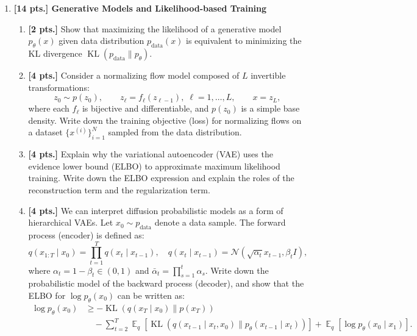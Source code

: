 \documentclass[11pt,a4paper]{article}
\DeclareMathOperator{\E}{\mathbb{E}}
\DeclareMathOperator{\KL}{KL}
\begin{document}
\begin{enumerate}[label=\textbf{\arabic*.}]
    \item \textbf{[14 pts.] Generative Models and Likelihood-based Training}
    \begin{enumerate}[label=(\a*)]
        \item \textbf{[2 pts.]} Show that maximizing the likelihood of a generative model $p_\theta(x)$ given data distribution $p_{\text{data}}(x)$ is equivalent to minimizing the KL divergence $\KL(p_{\text{data}} \parallel p_\theta)$.
        \item \textbf{[4 pts.]} Consider a normalizing flow model composed of $L$ invertible transformations:
        \[
        z_0 \sim p(z_0), \qquad z_\ell = f_\ell(z_{\ell-1}), \; \ell = 1, \dots, L, \qquad x = z_L,
        \]
        where each $f_\ell$ is bijective and differentiable, and $p(z_0)$ is a simple base density. Write down the training objective (loss) for normalizing flows on a dataset $\{x^{(i)}\}_{i=1}^N$ sampled from the data distribution.
        \item \textbf{[4 pts.]} Explain why the variational autoencoder (VAE) uses the evidence lower bound (ELBO) to approximate maximum likelihood training. Write down the ELBO expression and explain the roles of the reconstruction term and the regularization term.
        \item \textbf{[4 pts.]} We can interpret diffusion probabilistic models as a form of hierarchical VAEs. Let $x_0 \sim p_{\text{data}}$ denote a data sample. The forward process (encoder) is defined as:
        \[
        q(x_{1:T} \mid x_0) = \prod_{t=1}^T q(x_t \mid x_{t-1}), \quad q(x_t \mid x_{t-1}) = \mathcal{N}\left(\sqrt{\alpha_t} x_{t-1}, \beta_t I\right),
        \]
        where $\alpha_t = 1 - \beta_t \in (0, 1)$ and $\bar{\alpha}_t = \prod_{s=1}^t \alpha_s$.
        Write down the probabilistic model of the backward process (decoder), and show that the ELBO for $\log p_\theta(x_0)$ can be written as:
        \begin{align*}
        \log p_\theta(x_0) &\ge -\KL\left(q(x_T \mid x_0) \parallel p(x_T)\right) \\
        &\quad - \sum_{t=2}^T \E_q \left[ \KL\left(q(x_{t-1} \mid x_t, x_0) \parallel p_\theta(x_{t-1} \mid x_t)\right) \right] + \E_q \left[ \log p_\theta(x_0 \mid x_1) \right].
        \end{align*}
    \end{enumerate}


\end{enumerate}
\end{document}
